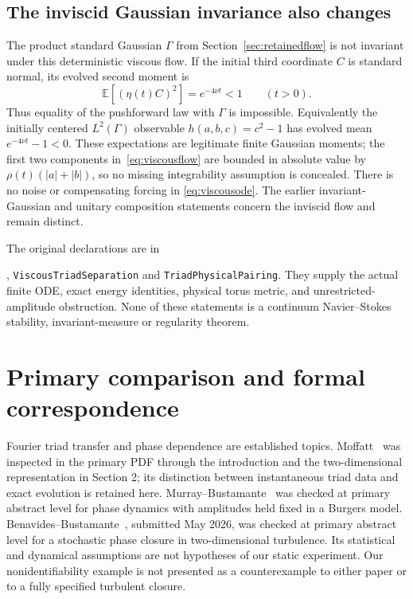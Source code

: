 \documentclass[11pt]{article}
\newcommand{\E}{\mathbb E}\newcommand{\Var}{\operatorname{Var}}
\newcommand{\code}[1]{{\small\nolinkurl{#1}}}
\begin{document}
\subsection*{The inviscid Gaussian invariance also changes}
The product standard Gaussian $\Gamma$ from Section~\ref{sec:retainedflow} is not invariant
under this deterministic viscous flow. If the initial third coordinate
$C$ is standard normal, its evolved second moment is
\[
 \E[(\eta(t)C)^2]=e^{-4\nu t}<1\qquad(t>0).
\]
Thus equality of the pushforward law with $\Gamma$ is impossible.
Equivalently the initially centered $L^2(\Gamma)$ observable
$h(a,b,c)=c^2-1$ has evolved mean $e^{-4\nu t}-1<0$.
These expectations are legitimate finite Gaussian moments; the first
two components in~\eqref{eq:viscousflow} are bounded in absolute
value by $\rho(t)(|a|+|b|)$, so no missing integrability assumption
is concealed. There is no noise or compensating forcing in
\eqref{eq:viscousode}. The earlier invariant-Gaussian and unitary
composition statements concern the inviscid flow and remain distinct.

The original declarations are in
\par\noindent\code{ViscousTriadFlow},
\code{ViscousTriadSeparation} and \code{TriadPhysicalPairing}.
They supply the actual finite ODE, exact energy identities, physical
torus metric, and unrestricted-amplitude obstruction. None of these
statements is a continuum Navier--Stokes stability, invariant-measure
or regularity theorem.

\section{Primary comparison and formal correspondence}
Fourier triad transfer and phase dependence are established topics.
Moffatt~\cite{moffatt} was inspected in the primary PDF through the
introduction and the two-dimensional representation in Section 2;
its distinction between instantaneous triad data and exact evolution
is retained here. Murray--Bustamante~\cite{murray} was checked at
primary abstract level for phase dynamics with amplitudes held fixed
in a Burgers model. Benavides--Bustamante~\cite{benavides}, submitted
May 2026, was checked at primary abstract level for a stochastic phase
closure in two-dimensional turbulence. Its statistical and dynamical
assumptions are not hypotheses of our static experiment. Our
nonidentifiability example is not presented as a counterexample to
either paper or to a fully specified turbulent closure.
\end{document}
